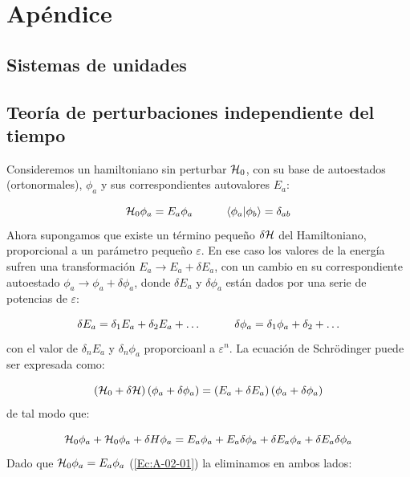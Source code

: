 \appendix 
\chapter{Apéndice} \label{Ch:Anex_A}

\section{Sistemas de unidades}

\section{Teoría de perturbaciones independiente del tiempo}

Consideremos un hamiltoniano sin perturbar $\mathcal{H}_0$, con su base de autoestados (ortonormales), $\phi_a$ y sus correspondientes autovalores $E_a$:

\begin{equation}
    \mathcal{H}_0 \phi_a = E_a \phi_a \quad \quad \quad \langle \phi_a | \phi_b \rangle = \delta_{ab}
    \label{Ec:A-02-01}
\end{equation}
Ahora supongamos que existe un término pequeño $\delta \mathcal{H}$ del Hamiltoniano, proporcional a un parámetro pequeño $\varepsilon$. En ese caso los valores de la energía sufren una transformación $E_a \rightarrow E_a + \delta E_a$, con un cambio en su correspondiente autoestado $\phi_a \rightarrow \phi_a + \delta \phi_a$, donde $\delta E_a$ y $\delta \phi_a$ están dados por una serie de potencias de $\varepsilon$:

\begin{equation}
    \delta E_a = \delta_1 E_a + \delta_2 E_a + \ldots \quad \quad \quad \delta \phi_a = \delta_1 \phi_a + \delta_2 + \ldots 
\end{equation}
con el valor de $\delta_n E_a$ y $\delta_n \phi_a$ proporcioanl a $ \varepsilon^n$. La ecuación de Schrödinger puede ser expresada como:

\begin{equation}
    \left( \mathcal{H}_0 + \delta \mathcal{H} \right) \left( \phi_a + \delta \phi_a \right) = \left( E_a + \delta E_a \right) \left( \phi_a + \delta \phi_a \right)
\end{equation}
de tal modo que:

\begin{equation}
    \mathcal{H}_0  \phi_a + \mathcal{H}_0 \phi_a + \delta H \phi_a = E_a \phi_a + E_a \delta \phi_a + \delta E_a \phi_a + \delta E_a \delta \phi_a \label{Ec:A-02-04}
\end{equation}
Dado que $\mathcal{H}_0 \phi_a = E_a \phi_a$ (\ref{Ec:A-02-01}) la eliminamos en ambos lados:
 
